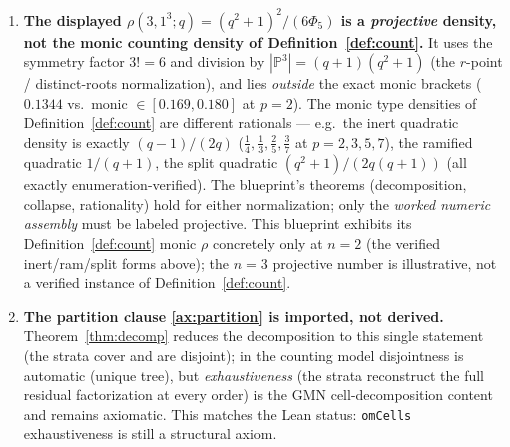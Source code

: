 \documentclass[11pt]{article}
\theoremstyle{definition}
\theoremstyle{remark}
\newcommand{\rhocount}{\rho}
\begin{document}
\begin{enumerate}[label=(C\arabic*),nosep]
$q^{-2}$, not $q^{-w(s)}$ --- Remark~\ref{rem:slowmode}). The correct object is the
nested recursion \eqref{eq:nested}, a finite system of interleaved geometric series
with pivots $q^{-w(b)}$, $b\le s$. \emph{Direct} exact enumeration over
$(\mathbb Z/p^N)^s$ confirms the $s=2$ single-geometric collapse exactly and gives
a \emph{rigorous bracket} $[L_N,L_N+U_N]$ containing the recursion's $I_3$
($8/31\in[0.25800,0.28131]$ at $p=2$; $189/484\in[0.39026,0.42699]$ at $p=3$); but
brute force does not reach the asymptotic regime to \emph{pin} $I_3,I_4$ as
rationals, so those rest on the \emph{symbolic} nested recursion (R1), not on direct
enumeration. The empirical OM-tree oracle reaches order $4$ ($n=8$). Genuinely
arbitrary depth rests on the induction (Thm.~\ref{thm:rational}) $+$
Axiom~\ref{ax:montes}, not on enumeration.
\item\textbf{The displayed $\rhocount(3,1^3;q)=(q^2+1)^2/(6\Phi_5)$ is a
\emph{projective} density, not the monic counting density of
Definition~\ref{def:count}.} It uses the symmetry factor $3!=6$ and division by
$|\mathbb P^3|=(q+1)(q^2+1)$ (the $r$-point / distinct-roots normalization), and
lies \emph{outside} the exact monic brackets ($0.1344$ vs.\ monic
$\in[0.169,0.180]$ at $p=2$). The monic type densities of Definition~\ref{def:count}
are different rationals --- e.g.\ the inert quadratic density is exactly $(q-1)/(2q)$
($\tfrac14,\tfrac13,\tfrac25,\tfrac37$ at $p=2,3,5,7$), the ramified quadratic
$1/(q+1)$, the split quadratic $(q^2+1)/(2q(q+1))$ (all exactly enumeration-verified).
The blueprint's theorems (decomposition, collapse, rationality) hold for either
normalization; only the \emph{worked numeric assembly} must be labeled projective.
This blueprint exhibits its Definition~\ref{def:count} monic $\rhocount$ concretely
only at $n=2$ (the verified inert/ram/split forms above); the $n=3$ projective
number is illustrative, not a verified instance of Definition~\ref{def:count}.
\item\textbf{The partition clause \ref{ax:partition} is imported, not derived.}
Theorem~\ref{thm:decomp} reduces the decomposition to this single statement (the
strata cover and are disjoint); in the counting model disjointness is automatic
(unique tree), but \emph{exhaustiveness} (the strata reconstruct the full residual
factorization at every order) is the GMN cell-decomposition content and remains
axiomatic. This matches the Lean status: \texttt{omCells} exhaustiveness is still a
structural axiom.
\end{enumerate}
\end{document}
